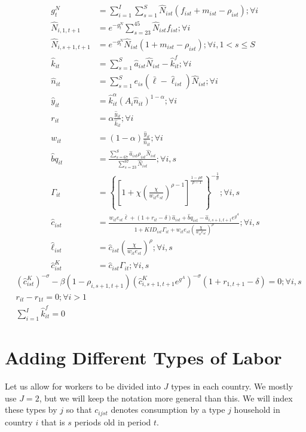 \documentclass[letterpaper,12pt]{article}
\theoremstyle{definition}
\numberwithin{equation}{section}
\begin{document}
\begin{spacing}{1.5}
	\begin{align}
		g^N_t & = \sum_{i=1}^I \sum_{s=1}^S \hat N_{ist} (f_{ist}+m_{ist}-\rho_{ist}) ; \forall i \label{eq_4gNdef}\\
		\hat N_{i,1,t+1} & = e^{-g^N_t}\sum_{s=23}^{45} \hat N_{ist} f_{ist} ; \forall i\\
		\hat N_{i,s+1,t+1} & = e^{-g^N_t}\hat N_{ist} (1+m_{ist}-\rho_{ist}); \forall i, 1<s\le S \label{eq_4pop2} \\
		\hat k_{it} & = \sum_{s=1}^S \hat a_{ist} \hat N_{ist} - \hat k_{it}^f; \forall i \\
		\hat n_{it} & = \sum_{s=1}^S e_{is} (\bar \ell - \hat \ell_{ist}) \hat N_{ist}; \forall i \\
		\hat y_{it} & = \hat k_{it}^\alpha \left( A_{i} \hat n_{it} \right)^{1-\alpha} ; \forall i \\
		r_{it} & = \alpha \frac{\hat y_{it}}{\hat k_{it}}; \forall i \\
		w_{it} & = (1-\alpha) \frac{\hat y_{it}}{\hat n_{it}}; \forall i \\
		\hat bq_{it} & = \frac{\sum_{s=67}^S \hat a_{ist} \rho_{ist} \hat N_{ist}}{\sum_{s=23}^{67} \hat N_{ist}} ; \forall i,s \\
		\Gamma_{it} & = \left\{ \left[1 + \chi \left(\frac{\chi}{w_{it} e_{st}}\right)^{\rho-1}\right]^{\tfrac{1-\rho \sigma}{\rho-1}}  \right\}^{-\tfrac{1}{\sigma}}; \forall i,s \\
    	\hat c_{ist} & = \frac{w_{it} e_{st} \bar \ell + (1+r_{it}-\delta)\hat a_{ist} +\hat bq_{ist} - \hat a_{i,s+1,t+1} e^{g^A}} {1 + KID_{ist}\Gamma_{it} +w_{it}e_{st} \left(\tfrac{\chi}{w_{it}e_{st}}\right)^\rho}; \forall i,s \\
		\hat \ell_{ist} & = \hat c_{ist} \left(\frac{\chi}{w_{it}e_{st}}\right)^\rho ; \forall i,s \\
		\hat c^K_{ist} & = \hat c_{ist} \Gamma_{it}; \forall i,s
	\end{align}
	\begin{align}
		& \left({\hat c^K_{ist}}\right)^{-\sigma} - \beta (1-\rho_{i,s+1,t+1}) \left(\hat c^K_{i,s+1,t+1} e^{g^A}\right)^{-\sigma}(1+r_{1,t+1}-\delta) = 0; \forall i,s \\
		& r_{it} - r_{1t} = 0; \forall i>1 \\
		& \sum_{i=1}^I \hat k^f_{it} = 0
	\end{align}


\newpage
\section{Adding Different Types of Labor}
	Let us allow for workers to be divided into $J$ types in each country.  We mostly use $J=2$, but we will keep the notation more general than this.  We will index these types by $j$ so that $c_{ijst}$ denotes consumption by a type $j$ household in country $i$ that is $s$ periods old in period $t$.


\end{spacing}
\end{document}
